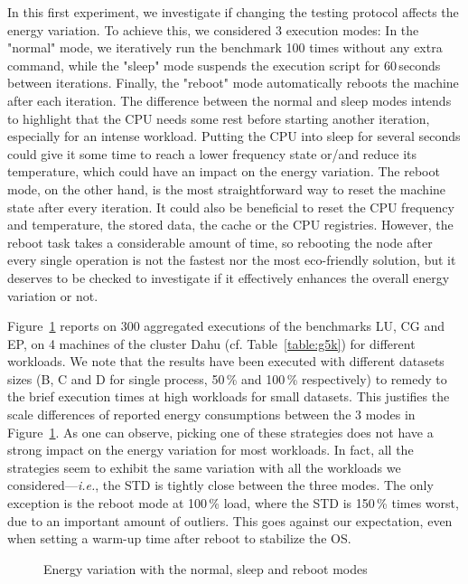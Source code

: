 In this first experiment, we investigate if changing the testing protocol affects the energy variation.
To achieve this, we considered 3 execution modes:
In the \textsf{"normal"} mode, we iteratively run the benchmark 100 times without any extra command, while the \textsf{"sleep"} mode suspends the execution script for 60\,seconds between iterations.
Finally, the \textsf{"reboot"} mode automatically reboots the machine after each iteration.
The difference between the \textsf{normal} and \textsf{sleep} modes intends to highlight that the CPU needs some rest before starting another iteration, especially for an intense workload.
Putting the CPU into sleep for several seconds could give it some time to reach a lower frequency state or/and reduce its temperature, which could have an impact on the energy variation.
The \textsf{reboot} mode, on the other hand, is the most straightforward way to reset the machine state after every iteration.
It could also be beneficial to reset the CPU frequency and temperature, the stored data, the cache or the CPU registries.
However, the reboot task takes a considerable amount of time, so rebooting the node after every single operation is not the fastest nor the most eco-friendly solution, but it deserves to be checked to investigate if it effectively enhances the overall energy variation or not.

Figure~\ref{fig:running-process} reports on $300$ aggregated executions of the  benchmarks \textsf{LU}, \textsf{CG} and \textsf{EP}, on 4 machines of the cluster \textsf{Dahu} (cf. Table~\ref{table:g5k}) for different workloads.
We note that the results have been executed with different datasets sizes (\textsf{B}, \textsf{C} and \textsf{D} for single process, 50\,\% and 100\,\% respectively) to remedy to the brief execution times at high workloads for small datasets.
This justifies the scale differences of reported energy consumptions between the 3 modes in Figure~\ref{fig:running-process}.
As one can observe, picking one of these strategies does not have a strong impact on the energy variation for most workloads.
In fact, all the strategies seem to exhibit the same variation with all the workloads we considered---\emph{i.e.}, the STD is tightly close between the three modes.
The only exception is the \textsf{reboot} mode at 100\,\% load, where the STD is 150\,\% times worst, due to an important amount of outliers.
This goes against our expectation, even when setting a warm-up time after reboot to stabilize the OS.

\begin{figure}
    \caption{Energy variation with the \textsf{normal}, \textsf{sleep} and \textsf{reboot} modes}\label{fig:running-process}
\end{figure}

